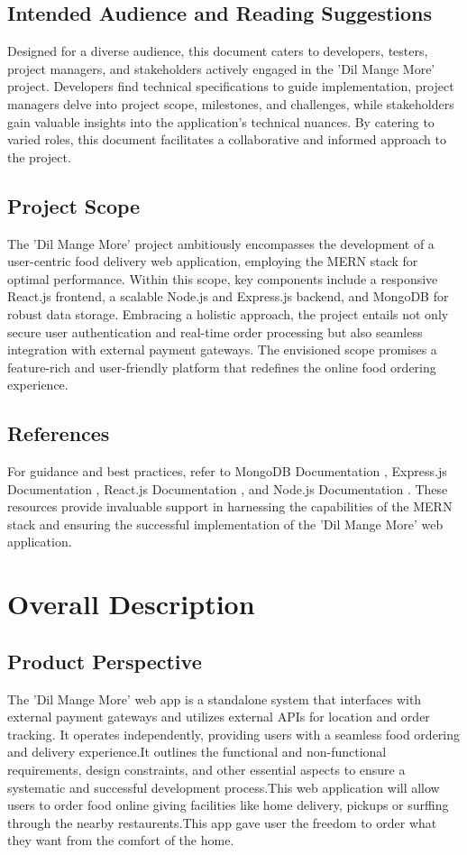 \documentclass{article}
\begin{document}
\subsection{Intended Audience and Reading Suggestions}
Designed for a diverse audience, this document caters to developers, testers, project managers, and stakeholders actively engaged in the 'Dil Mange More' project. Developers find technical specifications to guide implementation, project managers delve into project scope, milestones, and challenges, while stakeholders gain valuable insights into the application's technical nuances. By catering to varied roles, this document facilitates a collaborative and informed approach to the project.

\subsection{Project Scope}
The 'Dil Mange More' project ambitiously encompasses the development of a user-centric food delivery web application, employing the MERN stack for optimal performance. Within this scope, key components include a responsive React.js frontend, a scalable Node.js and Express.js backend, and MongoDB for robust data storage. Embracing a holistic approach, the project entails not only secure user authentication and real-time order processing but also seamless integration with external payment gateways. The envisioned scope promises a feature-rich and user-friendly platform that redefines the online food ordering experience.

\subsection{References}
For guidance and best practices, refer to MongoDB Documentation \cite{mongodb-doc}, Express.js Documentation \cite{express-doc}, React.js Documentation \cite{react-doc}, and Node.js Documentation \cite{node-doc}. These resources provide invaluable support in harnessing the capabilities of the MERN stack and ensuring the successful implementation of the 'Dil Mange More' web application.


\newpage
\section{Overall Description}
\subsection{Product Perspective}
The 'Dil Mange More' web app is a standalone system that interfaces with external payment gateways and utilizes external APIs for location and order tracking. It operates independently, providing users with a seamless food ordering and delivery experience.It outlines the functional and non-functional requirements, design constraints, and other essential aspects to ensure a systematic and successful development process.This web application will allow users to order food online giving facilities like home delivery, pickups or surffing through the nearby restaurents.This app gave user the freedom to order what they want from the comfort of the home.
\end{document}
